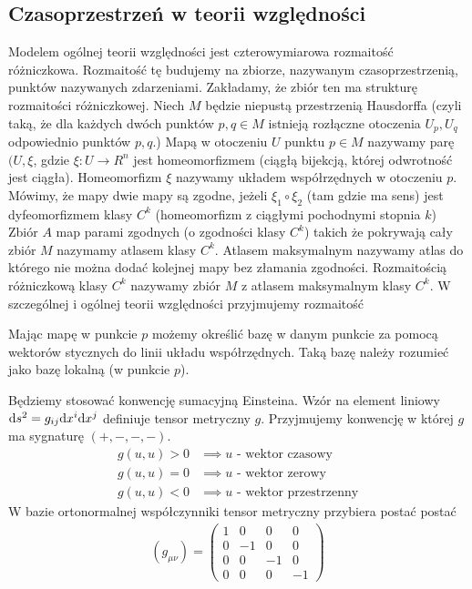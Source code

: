 \subsection{Czasoprzestrzeń w teorii względności}
Modelem ogólnej teorii względności jest czterowymiarowa 
rozmaitość różniczkowa. Rozmaitość tę budujemy na 
zbiorze, nazywanym czasoprzestrzenią, punktów nazywanych zdarzeniami. 
Zakładamy, że zbiór ten ma strukturę rozmaitości różniczkowej.
Niech $M$ będzie niepustą przestrzenią Hausdorffa (czyli taką, że
dla każdych dwóch punktów $p,q\in M$ 
istnieją rozłączne otoczenia $U_p,U_q$ odpowiednio punktów $p,q$.) 
Mapą w otoczeniu $U$ punktu $p\in M$ nazywamy parę $(U,\xi$, gdzie  
$\xi : U \to R^n$ jest homeomorfizmem (ciągłą bijekcją, której 
odwrotność jest ciągła). Homeomorfizm $\xi$ nazywamy układem współrzędnych 
w otoczeniu $p$.
Mówimy, że mapy dwie mapy są zgodne, jeżeli $\xi_1 \circ \xi_2$ (tam 
gdzie ma sens)
jest dyfeomorfizmem klasy $C^k$ (homeomorfizm z 
ciągłymi pochodnymi stopnia $k$)
Zbiór $A$ map parami zgodnych (o zgodności klasy $C^k$) 
takich że pokrywają cały zbiór $M$ nazymamy 
atlasem klasy $C^k$. Atlasem maksymalnym nazywamy atlas do którego
nie można dodać kolejnej mapy bez złamania zgodności.
Rozmaitością różniczkową klasy $C^k$ nazywamy 
zbiór $M$ z atlasem maksymalnym klasy $C^k$.
W szczególnej i ogólnej teorii względności przyjmujemy rozmaitość 

Mając mapę w punkcie $p$ możemy określić bazę w danym punkcie
za pomocą wektorów stycznych do linii układu współrzędnych.
Taką bazę należy rozumieć jako bazę lokalną (w punkcie $p$).


Będziemy stosować konwencję sumacyjną Einsteina.
Wzór na element liniowy $\text{d} s^2 = g_{ij} \text{d} x^i \text{d} x^j$ definiuje 
tensor metryczny $g$.
Przyjmujemy konwencję w której $g$ ma sygnaturę $(+,-,-,-)$.
\begin{align}
g(u,u) > 0& \implies u \text{ - wektor czasowy}\\
g(u,u) = 0& \implies u \text{ - wektor zerowy}\\
g(u,u) < 0& \implies u \text{ - wektor przestrzenny}
\end{align}
W bazie ortonormalnej współczynniki tensor metryczny przybiera postać 
postać 
\begin{align}
( g_{\mu\nu} ) = \left(
\begin{array}{cccc}
1 & 0 & 0 & 0\\
0 & -1 & 0 & 0 \\
0 & 0 & -1 & 0 \\
0 & 0 & 0 & -1 
\end{array}
\right)
\end{align}
